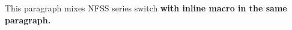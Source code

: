 This paragraph mixes NFSS series switch \bfseries with inline \textbf{macro} in the same paragraph.

